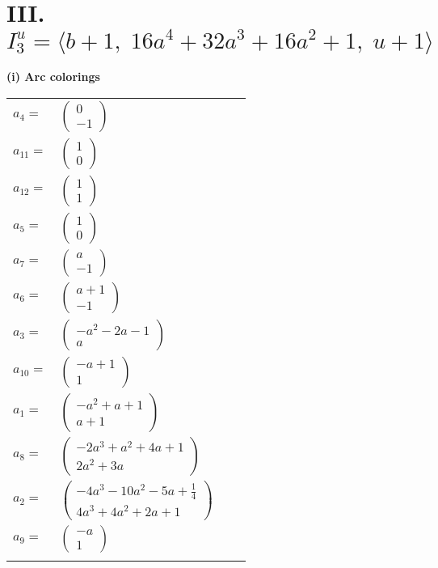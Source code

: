 \documentclass[1p]{elsarticle_modified}
\theoremstyle{definition}
\begin{document}
\centering \section*{III. $I^u_{3}= \langle b+1,\;16 a^4+32 a^3+16 a^2+1,\;u+1 \rangle$}
\flushleft \textbf{(i) Arc colorings}\\
\begin{tabular}{m{7pt} m{180pt} m{7pt} m{180pt} }
\flushright $a_{4}=$&$\begin{pmatrix}0\\-1\end{pmatrix}$ \\
\flushright $a_{11}=$&$\begin{pmatrix}1\\0\end{pmatrix}$ \\
\flushright $a_{12}=$&$\begin{pmatrix}1\\1\end{pmatrix}$ \\
\flushright $a_{5}=$&$\begin{pmatrix}1\\0\end{pmatrix}$ \\
\flushright $a_{7}=$&$\begin{pmatrix}a\\-1\end{pmatrix}$ \\
\flushright $a_{6}=$&$\begin{pmatrix}a+1\\-1\end{pmatrix}$ \\
\flushright $a_{3}=$&$\begin{pmatrix}- a^2-2 a-1\\a\end{pmatrix}$ \\
\flushright $a_{10}=$&$\begin{pmatrix}- a+1\\1\end{pmatrix}$ \\
\flushright $a_{1}=$&$\begin{pmatrix}- a^2+a+1\\a+1\end{pmatrix}$ \\
\flushright $a_{8}=$&$\begin{pmatrix}-2 a^3+a^2+4 a+1\\2 a^2+3 a\end{pmatrix}$ \\
\flushright $a_{2}=$&$\begin{pmatrix}-4 a^3-10 a^2-5 a+\frac{1}{4}\\4 a^3+4 a^2+2 a+1\end{pmatrix}$ \\
\flushright $a_{9}=$&$\begin{pmatrix}- a\\1\end{pmatrix}$\\&\end{tabular}
\end{document}
